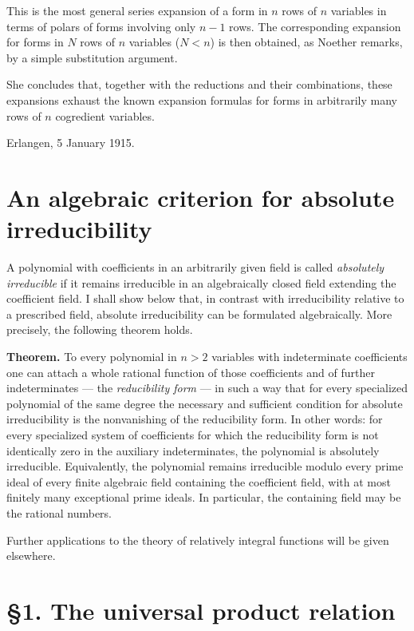 \documentclass[11pt]{article}
\begin{document}
This is the most general series expansion of a form in \(n\) rows of \(n\) variables in terms of polars of forms involving only \(n-1\) rows. The corresponding expansion for forms in \(N\) rows of \(n\) variables (\(N<n\)) is then obtained, as Noether remarks, by a simple substitution argument.

She concludes that, together with the reductions and their combinations, these expansions exhaust the known expansion formulas for forms in arbitrarily many rows of \(n\) cogredient variables.

\medskip
\noindent
Erlangen, 5 January 1915.

\clearpage

\section*{An algebraic criterion for absolute irreducibility}

A polynomial with coefficients in an arbitrarily given field is called \emph{absolutely irreducible} if it remains irreducible in an algebraically closed field extending the coefficient field. I shall show below that, in contrast with irreducibility relative to a prescribed field, absolute irreducibility can be formulated algebraically. More precisely, the following theorem holds.

\medskip
\noindent\textbf{Theorem.}
To every polynomial in $n>2$ variables with indeterminate coefficients one can attach a whole rational function of those coefficients and of further indeterminates --- the \emph{reducibility form} --- in such a way that for every specialized polynomial of the same degree the necessary and sufficient condition for absolute irreducibility is the nonvanishing of the reducibility form. In other words: for every specialized system of coefficients for which the reducibility form is not identically zero in the auxiliary indeterminates, the polynomial is absolutely irreducible. Equivalently, the polynomial remains irreducible modulo every prime ideal of every finite algebraic field containing the coefficient field, with at most finitely many exceptional prime ideals. In particular, the containing field may be the rational numbers.

Further applications to the theory of relatively integral functions will be given elsewhere.

\section*{\S 1. The universal product relation}
\end{document}
